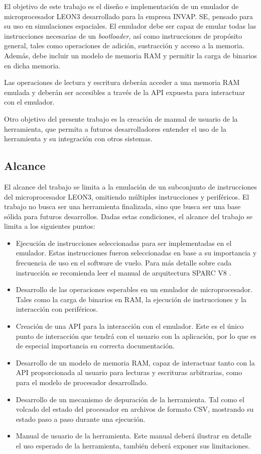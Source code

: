 El objetivo de este trabajo es el diseño e implementación de un emulador de microprocesador LEON3 desarrollado para la empresa INVAP. SE, pensado para su uso en simulaciones espaciales. El emulador debe ser capaz de emular todas las instrucciones necesarias de un  \textit{bootloader}, así como instrucciones de propósito general, tales como operaciones de adición, sustracción y acceso a la memoria. Además, debe incluir un modelo de memoria RAM y permitir la carga de binarios en dicha memoria.

Las operaciones de lectura y escritura deberán acceder a una memoria RAM emulada y deberán ser accesibles a través de la API expuesta para interactuar con el emulador.

Otro objetivo del presente trabajo es la creación de manual de usuario de la herramienta, que permita a futuros desarrolladores entender el uso de la herramienta y su integración con otros sistemas.

\subsection{Alcance}
\label{subsec:alcance}

El alcance del trabajo se limita a la emulación de un subconjunto de instrucciones del microprocesador LEON3, omitiendo múltiples instrucciones y periféricos. El trabajo no busca ser una herramienta finalizada, sino que busca ser una base sólida para futuros desarrollos. Dadas estas condiciones, el alcance del trabajo se limita a los siguientes puntos:

\begin{itemize}
\item Ejecución de instrucciones seleccionadas para ser implementadas en el emulador. Estas instrucciones fueron seleccionadas en base a su importancia y frecuencia de uso en el software de vuelo.
  Para más detalle sobre cada instrucción se recomienda leer el manual de arquitectura SPARC V8 \citep{SPARC}.

  \item Desarrollo de las operaciones esperables en un emulador de microprocesador. Tales como la carga de binarios en RAM, la ejecución de instrucciones y la interacción con periféricos.
  \item Creación de una API para la interacción con el emulador. Este es el único punto de interacción que tendrá con el usuario con la aplicación, por lo que es de especial importancia su correcta documentación.
  \item Desarrollo de un modelo de memoria RAM, capaz de interactuar tanto con la API proporcionada al usuario para lecturas y escrituras arbitrarias, como para el modelo de procesador desarrollado.
  \item Desarrollo de un mecanismo de depuración de la herramienta. Tal como el volcado del estado del procesador en archivos de formato CSV, mostrando su estado paso a paso durante una ejecución.
  \item Manual de usuario de la herramienta. Este manual deberá ilustrar en detalle el uso esperado de la herramienta, también deberá exponer sus limitaciones.
\end{itemize}
